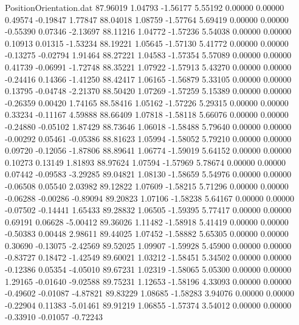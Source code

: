 \begin{filecontents}{PositionOrientation.dat}
  87.96019    1.04793   -1.56177     5.55192    0.00000    0.00000    0.49574   -0.19847    1.77847
  88.04018    1.08759   -1.57764     5.69419    0.00000    0.00000   -0.55390    0.07346   -2.13697
  88.11216    1.04772   -1.57236     5.54038    0.00000    0.00000    0.10913    0.01315   -1.53234
  88.19221    1.05645   -1.57130     5.41772    0.00000    0.00000   -0.13275   -0.02794    1.91464
  88.27221    1.04583   -1.57354     5.57089    0.00000    0.00000    0.41739   -0.06991   -1.72748
  88.35221    1.07922   -1.57913     5.43270    0.00000    0.00000   -0.24416    0.14366   -1.41250
  88.42417    1.06165   -1.56879     5.33105    0.00000    0.00000    0.13795   -0.04748   -2.21370
  88.50420    1.07269   -1.57259     5.15389    0.00000    0.00000   -0.26359    0.00420    1.74165
  88.58416    1.05162   -1.57226     5.29315    0.00000    0.00000    0.33234   -0.11167    4.59888
  88.66409    1.07818   -1.58118     5.66076    0.00000    0.00000   -0.24880   -0.05102    1.87429
  88.73646    1.06018   -1.58488     5.79640    0.00000    0.00000   -0.00292    0.05461   -0.05386
  88.81623    1.05994   -1.58052     5.79210    0.00000    0.00000    0.09720   -0.12056   -1.87806
  88.89641    1.06774   -1.59019     5.64152    0.00000    0.00000    0.10273    0.13149    1.81893
  88.97624    1.07594   -1.57969     5.78674    0.00000    0.00000    0.07442   -0.09583   -3.29285
  89.04821    1.08130   -1.58659     5.54976    0.00000    0.00000   -0.06508    0.05540    2.03982
  89.12822    1.07609   -1.58215     5.71296    0.00000    0.00000   -0.06288   -0.00286   -0.89094
  89.20823    1.07106   -1.58238     5.64167    0.00000    0.00000   -0.07502   -0.14441    1.65433
  89.28832    1.06505   -1.59395     5.77417    0.00000    0.00000    0.69191    0.06628   -5.00412
  89.36026    1.11482   -1.58918     5.41419    0.00000    0.00000   -0.50383    0.00448    2.98611
  89.44025    1.07452   -1.58882     5.65305    0.00000    0.00000    0.30690   -0.13075   -2.42569
  89.52025    1.09907   -1.59928     5.45900    0.00000    0.00000   -0.83727    0.18472   -1.42549
  89.60021    1.03212   -1.58451     5.34502    0.00000    0.00000   -0.12386    0.05354   -4.05010
  89.67231    1.02319   -1.58065     5.05300    0.00000    0.00000    1.29165   -0.01640   -9.02588
  89.75231    1.12653   -1.58196     4.33093    0.00000    0.00000   -0.49602   -0.01087   -4.87821
  89.83229    1.08685   -1.58283     3.94076    0.00000    0.00000   -0.22904    0.11383   -5.01461
  89.91219    1.06855   -1.57374     3.54012    0.00000    0.00000   -0.33910   -0.01057   -0.72243

\end{filecontents}
